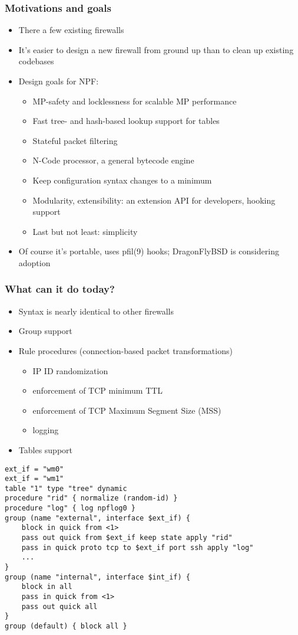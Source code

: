 \documentclass[magyar]{beamer}
\begin{document}
\begin{frame}
\frametitle{Motivations and goals}
\begin{itemize}
	\item There a few existing firewalls
	\item It's easier to design a new firewall from ground up than to clean up existing codebases
	\item Design goals for NPF:
	\begin{itemize}
		\item MP-safety and locklessness for scalable MP performance
		\item Fast tree- and hash-based lookup support for tables
		\item Stateful packet filtering
		\item N-Code processor, a general bytecode engine
		\item Keep configuration syntax changes to a minimum
		\item Modularity, extensibility: an extension API for developers, hooking support
		\item Last but not least: simplicity
	\end{itemize}
	\item Of course it's portable, uses pfil(9) hooks; DragonFlyBSD is considering adoption 
\end{itemize}
\end{frame}

\begin{frame}
\frametitle{What can it do today?}
\begin{itemize}
	\item Syntax is nearly identical to other firewalls
	\item Group support
	\item Rule procedures (connection-based packet transformations)
	\begin{itemize}
		\item IP ID randomization
		\item enforcement of TCP minimum TTL
		\item enforcement of TCP Maximum Segment Size (MSS)
		\item logging
	\end{itemize}
	\item Tables support
\end{itemize}
\end{frame}

\begin{frame}[fragile,basicstyle=\ttfamily]
\begin{verbatim}
ext_if = "wm0"
ext_if = "wm1"
table "1" type "tree" dynamic
procedure "rid" { normalize (random-id) }
procedure "log" { log npflog0 }
group (name "external", interface $ext_if) {
    block in quick from <1>
    pass out quick from $ext_if keep state apply "rid"
    pass in quick proto tcp to $ext_if port ssh apply "log"
    ...
}
group (name "internal", interface $int_if) {
    block in all
    pass in quick from <1>
    pass out quick all
}
group (default) { block all }
\end{verbatim}
\end{frame}
\end{document}
